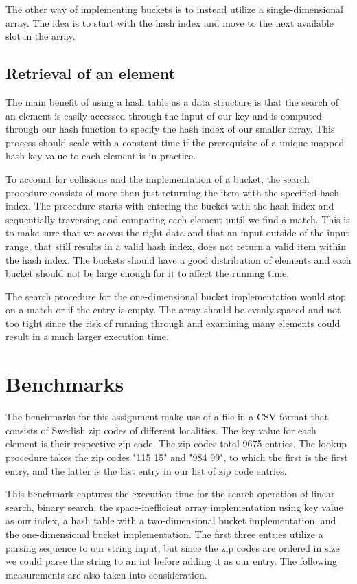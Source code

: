 \documentclass[a4paper,11pt]{article}
\begin{document}
        The other way of implementing buckets is to instead utilize a single-dimensional array. The idea is to start with the hash index and move to the next available slot in the array.

    \subsection*{Retrieval of an element}

        The main benefit of using a hash table as a data structure is that the search of an element is easily accessed through the input of our key and is computed through our hash function to specify the hash index of our smaller array. This process should scale with a constant time if the prerequisite of a unique mapped hash key value to each element is in practice. 
        
        To account for collisions and the implementation of a bucket, the search procedure consists of more than just returning the item with the specified hash index. The procedure starts with entering the bucket with the hash index and sequentially traversing and comparing each element until we find a match. This is to make sure that we access the right data and that an input outside of the input range, that still results in a valid hash index, does not return a valid item within the hash index. The buckets should have a good distribution of elements and each bucket should not be large enough for it to affect the running time. 
        
        The search procedure for the one-dimensional bucket implementation would stop on a match or if the entry is empty. The array should be evenly spaced and not too tight since the risk of running through and examining many elements could result in a much larger execution time.

\section*{Benchmarks}

    The benchmarks for this assignment make use of a file in a CSV format that consists of Swedish zip codes of different localities. The key value for each element is their respective zip code. The zip codes total 9675 entries. The lookup procedure takes the zip codes "115 15" and "984 99", to which the first is the first entry, and the latter is the last entry in our list of zip code entries. 
    
    This benchmark captures the execution time for the search operation of linear search, binary search, the space-inefficient array implementation using key value as our index, a hash table with a two-dimensional bucket implementation, and the one-dimensional bucket implementation. The first three entries utilize a parsing sequence to our string input, but since the zip codes are ordered in size we could parse the string to an int before adding it as our entry. The following measurements are also taken into consideration. 
\end{document}
